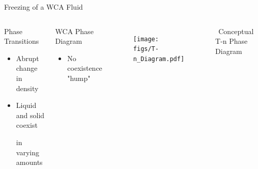 \documentclass{beamer}
\begin{document}
\begin{frame}{Freezing of a WCA Fluid}
	\begin{columns}[t]
		\begin{block}{Phase Transitions}
		     \begin{itemize}
				\item Abrupt change in density
				\item Liquid and solid coexist 
				
				in varying amounts
			 \end{itemize}		
		\end{block} 
		\begin{block}{WCA Phase Diagram}
		     \begin{itemize}
				\item No coexistence "hump"				
			  \end{itemize}				 
		\end{block}			       
	    \vspace{-2em}
		 \begin{figure}
            \centering
            \texttt{[image: figs/T-n\_Diagram.pdf]}
          \end{figure}
          \vspace{-1em}
         $~~$Conceptual T-n Phase Diagram          
	\end{columns}
    \vspace{+1em}
\end{frame}
\end{document}
